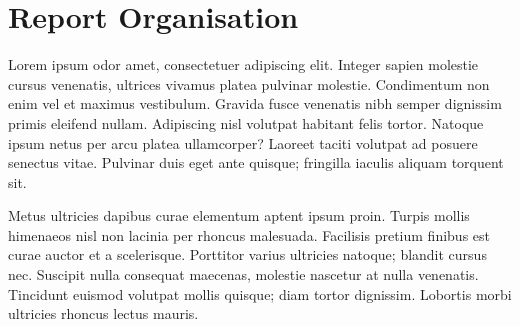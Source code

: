 \section{Report Organisation}
Lorem ipsum odor amet, consectetuer adipiscing elit. Integer sapien molestie cursus venenatis, ultrices vivamus platea pulvinar molestie. Condimentum non enim vel et maximus vestibulum. Gravida fusce venenatis nibh semper dignissim primis eleifend nullam. Adipiscing nisl volutpat habitant felis tortor. Natoque ipsum netus per arcu platea ullamcorper? Laoreet taciti volutpat ad posuere senectus vitae. Pulvinar duis eget ante quisque; fringilla iaculis aliquam torquent sit.

Metus ultricies dapibus curae elementum aptent ipsum proin. Turpis mollis himenaeos nisl non lacinia per rhoncus malesuada. Facilisis pretium finibus est curae auctor et a scelerisque. Porttitor varius ultricies natoque; blandit cursus nec. Suscipit nulla consequat maecenas, molestie nascetur at nulla venenatis. Tincidunt euismod volutpat mollis quisque; diam tortor dignissim. Lobortis morbi ultricies rhoncus lectus mauris.

